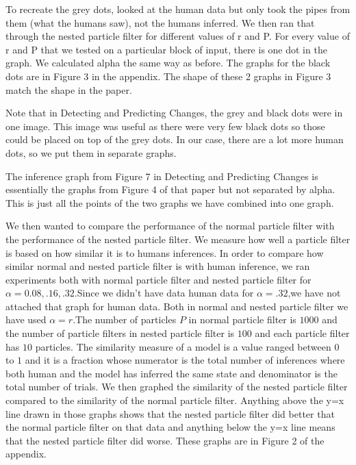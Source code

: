 \documentclass[12pt,letterpaper]{article}
\begin{document}
To recreate the grey dots, looked at the human data but only took the pipes from them (what the humans saw), not the humans inferred. We then ran that through the nested particle filter for different values of r and P. For every value of r and P that we tested on a particular block of input, there is one dot in the graph. We calculated alpha the same way as before. The graphs for the black dots are in Figure 3 in the appendix. The shape of these 2 graphs in Figure 3 match the shape in the paper.

Note that in Detecting and Predicting Changes, the grey and black dots were in one image. This image was useful as there were very few black dots so those could be placed on top of the grey dots. In our case, there are a lot more human dots, so we put them in separate graphs.

The inference graph from Figure 7 in Detecting and Predicting Changes is essentially the graphs from Figure 4 of that paper but not separated by alpha. This is just all the points of the two graphs we have combined into one graph.

We then wanted to compare the performance of the normal particle filter with the performance of the nested particle filter. We measure how well a particle filter is based on how similar it is to humans inferences. In order to compare how similar normal and nested particle filter is with human inference, we ran experiments both with normal particle filter and nested particle filter for $\alpha=0.08,.16,.32$.Since we didn't have data human data for $\alpha = .32$,we have not attached that graph for human data. Both in normal and nested particle filter we have used $\alpha=r$.The number of particles $P$ in normal particle filter is $1000$ and the number of particle filters in nested particle filter is $100$ and each particle filter has $10$ particles. The similarity measure of a model is a value ranged between $0$ to $1$ and it is a fraction whose numerator is the total number of inferences where both human and the model has inferred the same state and denominator is the total number of trials. We then graphed the similarity of the nested particle filter compared to the similarity of the normal particle filter. Anything above the y=x line drawn in those graphs shows that the nested particle filter did better that the normal particle filter on that data and anything below the y=x line means that the nested particle filter did worse. These graphs are in Figure 2 of the appendix.
 
\end{document}
